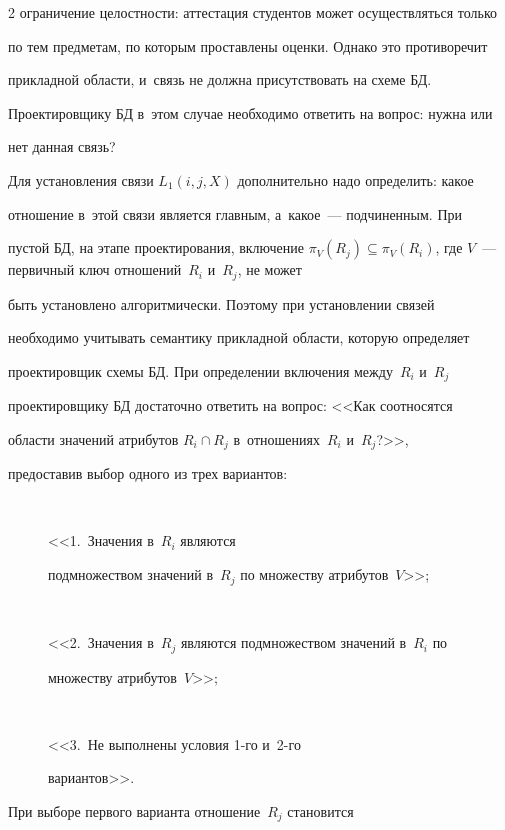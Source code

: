 \begin{multicols}{2}
ограничение целостности: аттестация студентов может осуществляться только

по тем предметам, по которым проставлены оценки. Однако это противоречит

прикладной области, и~связь не должна присутствовать на схеме БД.

Проектировщику БД в~этом случае необходимо ответить на вопрос: нужна или

нет данная связь?



  Для установления связи $L_1(i,j,X)$ дополнительно надо определить: какое

отношение в~этой связи является главным, а~какое~--- подчиненным. При

пустой БД, на этапе проектирования, включение $\pi_V(R_j)\subseteq

\pi_V(R_i)$, где $V$~--- первичный ключ отношений~$R_i$ и~$R_j$, не может

быть установлено алгоритмически. Поэтому при установлении связей

необходимо учитывать семантику прикладной области, которую определяет

проектировщик схемы БД. При определении включения между~$R_i$ и~$R_j$

проектировщику БД достаточно ответить на вопрос: <<Как соотносятся

области значений атрибутов $R_i\cap R_j$ в~отношениях~$R_i$ и~$R_{j}$?>>,

предоставив выбор одного из трех вариантов: 

\begin{description}

\item[\,] <<1.~Значения в~$R_i$ являются

подмножеством значений в~$R_j$ по множеству атрибутов~$V$>>;

\item[\,] <<2.~Значения в~$R_j$ являются подмножеством значений в~$R_i$ по

множеству атрибутов~$V$>>; 

\item[\,] <<3.~Не выполнены условия 1-го и~2-го

вариантов>>.

\end{description}



 При выборе первого варианта отношение~$R_j$ становится


\end{multicols}
